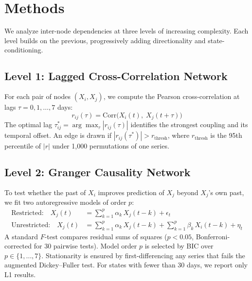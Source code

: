 \documentclass[letterpaper]{article}
\begin{document}
\section{Methods}

We analyze inter-node dependencies at three levels of increasing complexity. Each level builds on the previous, progressively adding directionality and state-conditioning.

\subsection{Level 1: Lagged Cross-Correlation Network}

For each pair of nodes $(X_i, X_j)$, we compute the Pearson cross-correlation at lags $\tau = 0, 1, \ldots, 7$ days:
\begin{equation}
r_{ij}(\tau) = \text{Corr}\bigl(X_i(t),\; X_j(t + \tau)\bigr)
\end{equation}
The optimal lag $\tau^*_{ij} = \arg\max_\tau |r_{ij}(\tau)|$ identifies the strongest coupling and its temporal offset. An edge is drawn if $|r_{ij}(\tau^*)| > r_{\text{thresh}}$, where $r_{\text{thresh}}$ is the 95th percentile of $|r|$ under 1{,}000 permutations of one series.

\subsection{Level 2: Granger Causality Network}

To test whether the past of $X_i$ improves prediction of $X_j$ beyond $X_j$'s own past, we fit two autoregressive models of order $p$:
\begin{align}
\text{Restricted:}\quad X_j(t) &= \textstyle\sum_{k=1}^{p} \alpha_k\, X_j(t\!-\!k) + \epsilon_t \\
\text{Unrestricted:}\quad X_j(t) &= \textstyle\sum_{k=1}^{p} \alpha_k\, X_j(t\!-\!k) + \textstyle\sum_{k=1}^{p} \beta_k\, X_i(t\!-\!k) + \eta_t
\end{align}
A standard $F$-test compares residual sums of squares ($p < 0.05$, Bonferroni-corrected for 30 pairwise tests). Model order $p$ is selected by BIC over $p \in \{1, \ldots, 7\}$. Stationarity is ensured by first-differencing any series that fails the augmented Dickey--Fuller test. For states with fewer than 30 days, we report only L1 results.
\end{document}
